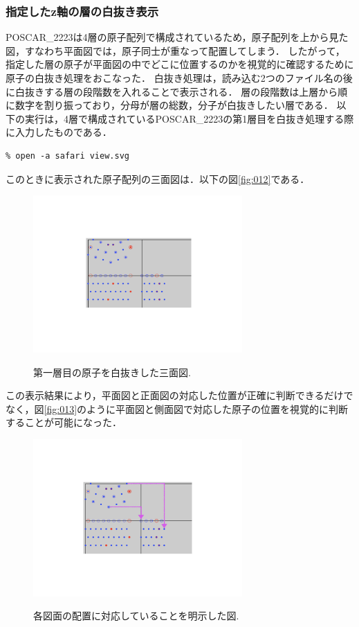 \subsubsection{指定したz軸の層の白抜き表示}
POSCAR\_2223は4層の原子配列で構成されているため，原子配列を上から見た図，すなわち平面図では，原子同士が重なって配置してしまう．
したがって，指定した層の原子が平面図の中でどこに位置するのかを視覚的に確認するために原子の白抜き処理をおこなった．
白抜き処理は，読み込む2つのファイル名の後に白抜きする層の段階数を入れることで表示される．
層の段階数は上層から順に数字を割り振っており，分母が層の総数，分子が白抜きしたい層である．
以下の実行は，4層で構成されているPOSCAR\_2223の第1層目を白抜き処理する際に入力したものである．
\begin{lstlisting}[style=customCsh,basicstyle={\scriptsize\ttfamily}]
% ruby viewer.rb POSCAR_2223 POSCAR_2223_4 1/4
% open -a safari view.svg 
\end{lstlisting}
このときに表示された原子配列の三面図は．以下の図\ref{fig:012}である．

\begin{figure}[htbp]\begin{center}
\includegraphics[width=8cm,bb= 0 0 937 753]{../figs/./boundary_narita.012.jpeg}
\caption{第一層目の原子を白抜きした三面図.}
\label{fig:012}
\label{default}\end{center}\end{figure}

この表示結果により，平面図と正面図の対応した位置が正確に判断できるだけでなく，図\ref{fig:013}のように平面図と側面図で対応した原子の位置を視覚的に判断することが可能になった．

\begin{figure}[htbp]\begin{center}
\includegraphics[width=8cm,bb= 0 0 937 753]{../figs/./boundary_narita.013.jpeg}
\caption{各図面の配置に対応していることを明示した図.}
\label{fig:013}
\label{default}\end{center}\end{figure}


